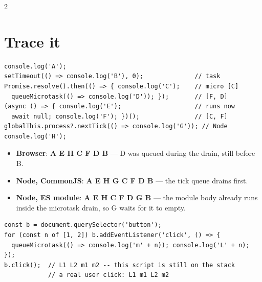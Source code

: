\documentclass[8pt]{extarticle}
\begin{document}
\begin{multicols}{2}
\section{Trace it}
\begin{lstlisting}[style=js]
console.log('A');
setTimeout(() => console.log('B'), 0);              // task
Promise.resolve().then(() => { console.log('C');    // micro [C]
  queueMicrotask(() => console.log('D')); });       // [F, D]
(async () => { console.log('E');                    // runs now
  await null; console.log('F'); })();               // [C, F]
globalThis.process?.nextTick(() => console.log('G')); // Node
console.log('H');
\end{lstlisting}
\begin{itemize}
  \item \textbf{Browser}: \textbf{A E H C F D B} — D was queued during the drain, still before B.
  \item \textbf{Node, CommonJS}: \textbf{A E H G C F D B} — the tick queue drains first.
  \item \textbf{Node, ES module}: \textbf{A E H C F D G B} — the module body already runs inside the
        microtask drain, so G waits for it to empty.
\end{itemize}
\begin{lstlisting}[style=js]
const b = document.querySelector('button');
for (const n of [1, 2]) b.addEventListener('click', () => {
  queueMicrotask(() => console.log('m' + n)); console.log('L' + n); });
b.click();  // L1 L2 m1 m2 -- this script is still on the stack
            // a real user click: L1 m1 L2 m2
\end{lstlisting}

\columnbreak


\end{multicols}
\end{document}
